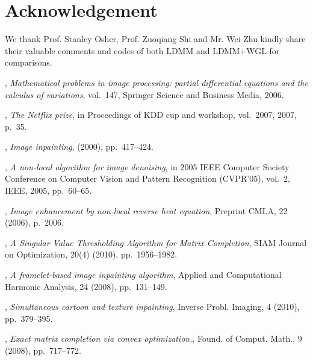 \documentclass[letterpaper,10pt]{article}
\begin{document}
\section*{Acknowledgement} We thank Prof. Stanley Osher, Prof. Zuoqiang Shi and Mr. Wei Zhu kindly share their valuable comments and codes of both LDMM and LDMM+WGL for comparisons.

%
\begin{thebibliography}{10}

, {\em Mathematical problems in image
  processing: partial differential equations and the calculus of variations},
  vol.~147, Springer Science and Business Media, 2006.

, {\em The {N}etflix prize}, in Proceedings of
  KDD cup and workshop, vol.~2007, 2007, p.~35.

, {\em {Image
  inpainting}},  (2000), pp.~417--424.

, {\em A non-local algorithm for image
  denoising}, in 2005 IEEE Computer Society Conference on Computer Vision and
  Pattern Recognition (CVPR'05), vol.~2, IEEE, 2005, pp.~60--65.

\leavevmode\vrule height 2pt depth -1.6pt width 23pt, {\em Image enhancement by
  non-local reverse heat equation}, Preprint CMLA, 22 (2006), p.~2006.

, {\em {A Singular Value
  Thresholding Algorithm for Matrix Completion}}, SIAM Journal on Optimization,
  20(4) (2010), pp.~1956--1982.

, {\em {A framelet-based image inpainting
  algorithm}}, Applied and Computational Harmonic Analysis, 24 (2008),
  pp.~131--149.

, {\em Simultaneous cartoon and texture
  inpainting}, Inverse Probl. Imaging, 4 (2010), pp.~379--395.

, {\em Exact matrix completion via convex
  optimization.}, Found. of Comput. Math., 9 (2008), pp.~717--772.


\end{thebibliography}
\end{document}
